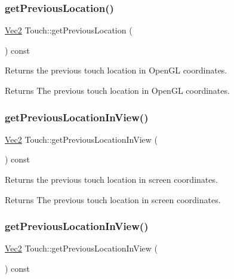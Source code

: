 \subsubsection{\texorpdfstring{get\+Previous\+Location()}{getPreviousLocation()}\hspace{0.1cm}{\footnotesize\ttfamily [2/2]}}
{\footnotesize\ttfamily \hyperlink{classVec2}{Vec2} Touch\+::get\+Previous\+Location (\begin{DoxyParamCaption}{ }\end{DoxyParamCaption}) const}

Returns the previous touch location in Open\+GL coordinates.

\begin{DoxyReturn}{Returns}
The previous touch location in Open\+GL coordinates. 
\end{DoxyReturn}
\mbox{\label{classTouch_add6c4fcef98e104067cf833639ac410d}} 
\subsubsection{\texorpdfstring{get\+Previous\+Location\+In\+View()}{getPreviousLocationInView()}\hspace{0.1cm}{\footnotesize\ttfamily [1/2]}}
{\footnotesize\ttfamily \hyperlink{classVec2}{Vec2} Touch\+::get\+Previous\+Location\+In\+View (\begin{DoxyParamCaption}{ }\end{DoxyParamCaption}) const}

Returns the previous touch location in screen coordinates.

\begin{DoxyReturn}{Returns}
The previous touch location in screen coordinates. 
\end{DoxyReturn}
\mbox{\label{classTouch_add6c4fcef98e104067cf833639ac410d}} 
\subsubsection{\texorpdfstring{get\+Previous\+Location\+In\+View()}{getPreviousLocationInView()}\hspace{0.1cm}{\footnotesize\ttfamily [2/2]}}
{\footnotesize\ttfamily \hyperlink{classVec2}{Vec2} Touch\+::get\+Previous\+Location\+In\+View (\begin{DoxyParamCaption}{ }\end{DoxyParamCaption}) const}

